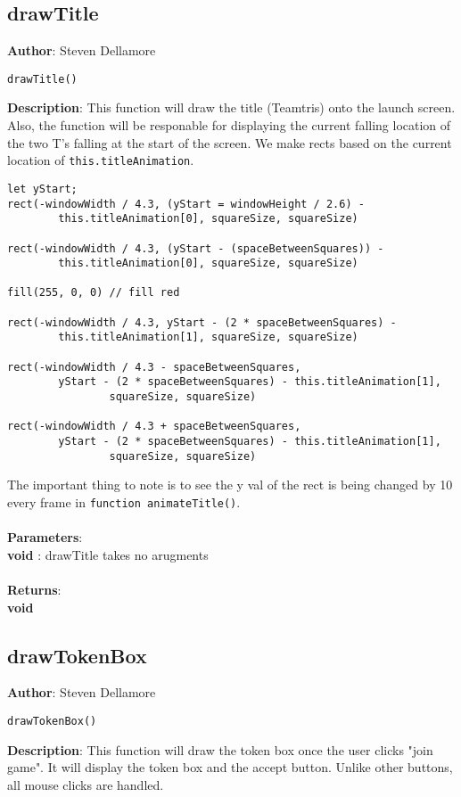 \documentclass[12pt]{article}
\begin{document}
\subsection{drawTitle}
\textbf{Author}: Steven Dellamore 
\vspace*{1\baselineskip}
\begin{lstlisting}
drawTitle()
\end{lstlisting} 
\vspace*{1\baselineskip}
\textbf{Description}: This function will draw the title (Teamtris) onto the launch screen. Also, the function will be responable for displaying the current falling location of the two T's falling at the start of the screen. We make rects based on the current location of \texttt{this.titleAnimation}. 
\begin{verbatim}
let yStart;
rect(-windowWidth / 4.3, (yStart = windowHeight / 2.6) - 
		this.titleAnimation[0], squareSize, squareSize) 

rect(-windowWidth / 4.3, (yStart - (spaceBetweenSquares)) - 
		this.titleAnimation[0], squareSize, squareSize) 

fill(255, 0, 0) // fill red

rect(-windowWidth / 4.3, yStart - (2 * spaceBetweenSquares) - 
		this.titleAnimation[1], squareSize, squareSize)

rect(-windowWidth / 4.3 - spaceBetweenSquares, 
		yStart - (2 * spaceBetweenSquares) - this.titleAnimation[1], 
				squareSize, squareSize)

rect(-windowWidth / 4.3 + spaceBetweenSquares, 
		yStart - (2 * spaceBetweenSquares) - this.titleAnimation[1], 
				squareSize, squareSize)
\end{verbatim}
 The important thing to note is to see the y val of the rect is being changed by 10 every frame in \texttt{function animateTitle()}. \\


\textbf{\large{\\Parameters}}:\\
\textbf{void }: drawTitle takes no arugments\\\textbf{\large{\\Returns}}:\\\textbf{void}

\subsection{drawTokenBox}
\textbf{Author}: Steven Dellamore 
\vspace*{1\baselineskip}
\begin{lstlisting}
drawTokenBox()
\end{lstlisting} 
\vspace*{1\baselineskip}
\textbf{Description}: This function will draw the token box once the user clicks "join game". It will display the token box and the accept button. Unlike other buttons, all mouse clicks are handled. \\
\end{document}
